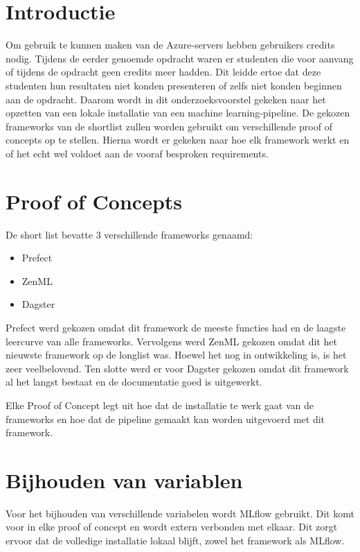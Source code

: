 \documentclass[a0,portrait]{hogent-poster}
\begin{document}
\begin{multicols}{2} %

\section{Introductie}


Om gebruik te kunnen maken van de Azure-servers hebben gebruikers credits nodig. Tijdens de eerder genoemde opdracht waren er studenten die voor aanvang of tijdens de opdracht geen credits meer hadden. Dit leidde ertoe dat deze studenten hun resultaten niet konden presenteren of zelfs niet konden beginnen aan de opdracht. Daarom wordt in dit onderzoeksvoorstel gekeken naar het opzetten van een lokale installatie van een machine learning-pipeline.
De gekozen frameworks van de shortlist zullen worden gebruikt om verschillende proof of concepts op te stellen. Hierna wordt er gekeken naar hoe elk framework werkt en of het echt wel voldoet aan de vooraf besproken requirements.


\section{Proof of Concepts}
De short list bevatte 3 verschillende frameworks genaamd:
\begin{itemize}
  \item Prefect
  \item ZenML
  \item Dagster
\end{itemize}

Prefect werd gekozen omdat dit framework de meeste functies had en de laagste leercurve van alle frameworks. Vervolgens werd ZenML gekozen omdat dit het nieuwste framework op de longlist was. Hoewel het nog in ontwikkeling is, is het zeer veelbelovend. Ten slotte werd er voor Dagster gekozen omdat dit framework al het langst bestaat en de documentatie goed is uitgewerkt.

Elke Proof of Concept legt uit hoe dat de installatie te werk gaat van de frameworks en hoe dat de pipeline gemaakt kan worden uitgevoerd met dit framework.

\section{Bijhouden van variablen}

Voor het bijhouden van verschillende variabelen wordt MLflow gebruikt. Dit komt voor in elke proof of concept en wordt extern verbonden met elkaar. Dit zorgt ervoor dat de volledige installatie lokaal blijft, zowel het framework als MLflow.


\end{multicols}
\end{document}
